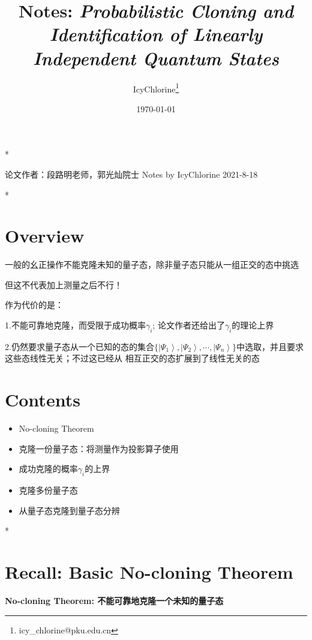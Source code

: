 \documentclass[UTF8]{ctexart}
\title{Notes: \emph{Probabilistic Cloning and Identification of Linearly Independent Quantum States}}
\author{IcyChlorine\footnote{icy\_chlorine@pku.edu.cn}}
\date{\today}
\newcommand\ket[1]{\left|#1\right\rangle}
\newcommand\g{\gamma}
\begin{document}
	\maketitle


\begin{center}
	*\quad*\quad*
\end{center}

论文作者：段路明老师，郭光灿院士
Notes by IcyChlorine 2021-8-18

\begin{center}
	*\quad*\quad*
\end{center}

\section{Overview}

一般的幺正操作不能克隆未知的量子态，除非量子态只能从一组正交的态中挑选

但这不代表加上测量之后不行！

作为代价的是：

1.不能可靠地克隆，而受限于成功概率$\gamma_i$; 论文作者还给出了$\gamma_i$的理论上界

2.仍然要求量子态从一个已知的态的集合$\{\ket{\Psi_1},\ket{\Psi_2},\cdots,\ket{\Psi_n}\}$中选取，并且要求这些态线性无关；不过这已经从 {相互正交的态}扩展到了{线性无关的态}

\section{Contents}

\begin{itemize}	\item No-cloning Theorem
	\item 克隆一份量子态：将测量作为投影算子使用
	\item 成功克隆的概率$\g_i$的上界
	\item 克隆多份量子态
	\item 从量子态克隆到量子态分辨
\end{itemize}
\begin{center}
	*\quad*\quad*
\end{center}

\section{Recall: Basic No-cloning Theorem}

\textbf{No-cloning Theorem: 不能可靠地克隆一个未知的量子态}
\end{document}
